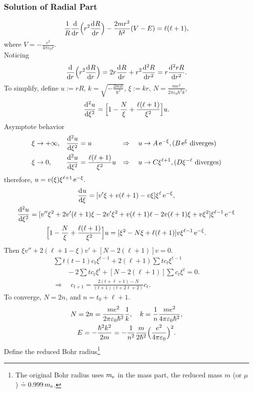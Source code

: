 \documentclass{article}
\begin{document}
\subsubsection{Solution of Radial Part}
$$\frac1R\dd r\Bigp{r^2\dv Rr}-\frac{2mr^2}{\hbar^2}(V-E)=\ell(\ell+1),$$
where $V=-\frac{e^2}{4\pi\varepsilon_0r}$.\\
Noticing
$$\dd r\Bigp{r^2\dv Rr}=2r\dv Rr+r^2\dv[2] Rr=r\dv[2]{rR}r.$$
To simplify, define $u:=rR$, $k=\sqrt{-\frac{2mE}{\hbar^2}}$, $\xi:=kr$, $N=\frac{me^2}{2\pi\varepsilon_0\hbar^2k}$,
\begin{align}\label{radeqn}
	\dv[2] u\xi=\Bigl[1-\frac N\xi+\frac{\ell(\ell+1)}{\xi^2}\Bigr]u.
\end{align}
Asymptote behavior
\begin{align*}
	\xi & \to+\infty, & \dv[2] u\xi & =u                           & \Rightarrow\quad u & \to A\e^{-\xi},(B\e^\xi{\rm~diverges})           \\
	\xi & \to0,       & \dv[2] u\xi & =\frac{\ell(\ell+1)}{\xi^2}u & \Rightarrow\quad u & \to C\xi^{\ell+1},(D\xi^{-\ell}{\rm~diverges})
\end{align*}
therefore, $u=v(\xi)\xi^{\ell+1}\e^{-\xi}.$
\begin{gather*}
	\dv u\xi=[v'\xi+v(\ell+1)-v\xi]\xi^\ell \e^{-\xi},\\
	\dv[2] u\xi=[v''\xi^2+2v'(\ell+1)\xi-2v'\xi^2+v(\ell+1)\ell-2v(\ell+1)\xi+v\xi^2]\xi^{\ell-1}\e^{-\xi}\\
	\Bigl[1-\frac N\xi+\frac{\ell(\ell+1)}{\xi^2}\Bigr]u=[\xi^2-N\xi+\ell(\ell+1)]v\xi^{\ell-1}\e^{-\xi}.
\end{gather*}
Then $\xi v''+2(\ell+1-\xi)v'+[N-2(\ell+1)]v=0.$
\begin{gather*}
	\sum t(t-1)c_t\xi^{t-1}+2(\ell+1)\sum tc_t\xi^{t-1}\qquad\\
	\qquad-2\sum tc_t\xi^t+[N-2(\ell+1)]\sum c_t\xi^t=0.\\
	\Rightarrow\quad c_{t+1}=\frac{2(t+\ell+1)-N}{(t+1)(t+2\ell+2)}c_t.
\end{gather*}
To converge, $N=2n$, and $n=t_0+\ell+1$.
\begin{gather*}
	N=2n=\frac{me^2}{2\pi\varepsilon_0\hbar^2}\frac1k,\quad
	k=\frac1n\frac{me^2}{4\pi\varepsilon_0\hbar^2},\\
	E=-\frac{\hbar^2k^2}{2m}=-\frac1{n^2}\frac m{2\hbar^2}\Bigl(\frac{e^2}{4\pi\varepsilon_0}\Bigr)^2.
\end{gather*}
Define the reduced Bohr radius\footnote{The original Bohr radius uses $m_{\electron}$ in the mass part, the reduced mass $m$ (or $\mu$) $\doteq 0.999\,m_{\electron}$.}
\end{document}
